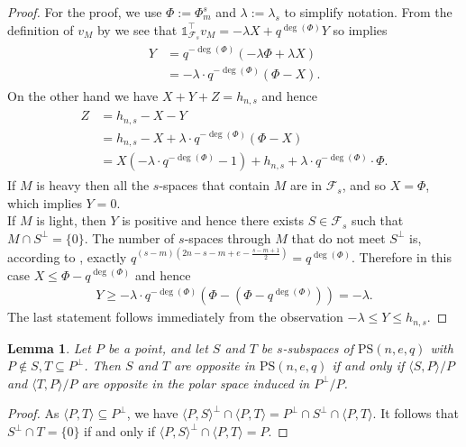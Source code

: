 \documentclass[11pt]{article}
\newtheorem{lemma}[thm]{Lemma}
\newcommand{\charvec}{\mathds{1}}
\newcommand{\EKR}{\mathcal{F}}
\newcommand{\PS}{\mathrm{PS}}
\renewcommand{\leq}{\leqslant}
\renewcommand{\geq}{\geqslant}
\begin{document}
\begin{proof} 
For the proof, we use $\Phi:=\Phi_m^s$ and $\lambda:=\lambda_s$ to simplify notation.
From the definition of $v_M$ by  we see that 
$\charvec_{\EKR_s}^\top v_M=-\lambda X+q^{\deg(\Phi)}Y $ 
so  implies
\begin{align*}
	\begin{split}
		Y&=q^{-\deg(\Phi)}(-\lambda \Phi +\lambda X)\\
            &=-\lambda \cdot q^{-\deg(\Phi)}(\Phi-X).
		\end{split}
\end{align*}
On the other hand we have $X+Y+Z=h_{n,s}$ and hence
\begin{align*}
    \begin{split}
        Z&= h_{n,s}-X-Y\\
        &= h_{n,s}-X+\lambda \cdot q^{-\deg(\Phi)}(\Phi-X)\\
        &=X(-\lambda \cdot q^{-\deg(\Phi)}-1)+ h_{n,s} +  \lambda \cdot q^{-\deg(\Phi)} \cdot \Phi.
    \end{split}
\end{align*}
If $M$ is heavy then all the $s$-spaces that contain $M$ are in $\EKR_s$, and so $X = \Phi$,
which implies $Y = 0$.\\

 If $M$ is light, then $Y$ is positive and hence there exists $S \in \EKR_s$ such that $M\cap  S^\perp=\{0\}$. The number of $s$-spaces through $M$ that do not meet $S^\perp$ is, according to , exactly $q^{(s-m)(2n-s-m+e-\frac{s-m+1}{2})}=q^{\deg(\Phi)}$. Therefore in this case $X \leq \Phi-q^{\deg(\Phi)}$ and hence 
 \begin{align*}
     Y \geq   -\lambda \cdot q^{-\deg(\Phi)}(\Phi-(\Phi-q^{\deg(\Phi)})) =-\lambda.
 \end{align*}
The last statement follows immediately from the observation $-\lambda \leq Y \leq h_{n,s}$.
\end{proof}


\begin{lemma}
Let $P$ be a point, and let $S$ and $T$ be $s$-subspaces of $\PS(n,e,q)$ with $P\notin S,T \subseteq P^\perp$. Then $S$ and $T$ are opposite in $\PS(n,e,q)$ if and only if $\langle S,P\rangle /P$ and $\langle T,P\rangle /P$ are opposite in the polar space induced in $P^\perp/P$.
\end{lemma}

\begin{proof}
    As $\langle P,T \rangle\subseteq P^\perp$, we have $\langle P,S\rangle^\perp \cap \langle P,T \rangle=P^\perp \cap S^\perp \cap \langle P,T \rangle$. It follows that $S^\perp \cap T=\{ 0\}$ if and only if $\langle P,S \rangle^\perp \cap \langle P,T \rangle=P$.
\end{proof}
\end{document}
